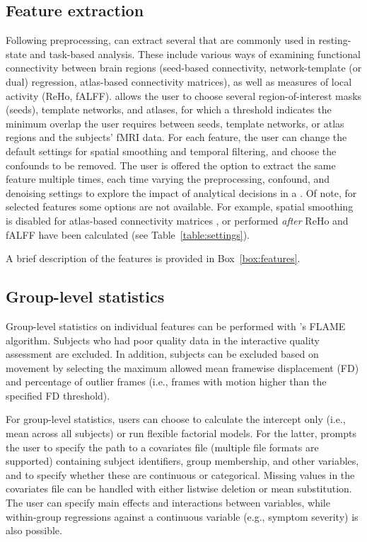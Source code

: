 \subsection{Feature extraction}\label{sec:featureextraction}

Following preprocessing,  can extract several
 that are commonly used in resting-state and task-based
analysis. These include various ways of examining functional connectivity
between brain regions (seed-based connectivity, network-template (or dual)
regression, atlas-based connectivity matrices), as well as measures of
local activity (ReHo, fALFF).  allows the user to choose
several region-of-interest masks (seeds), template networks, and atlases,
for which a threshold indicates the minimum overlap the user requires
between seeds, template networks, or atlas regions and the subjects' fMRI
data. For each feature, the user can change the default settings for
spatial smoothing and temporal filtering, and choose the confounds to be
removed. The user is offered the option to extract the same feature
multiple times, each time varying the preprocessing, confound, and
denoising settings to explore the impact of analytical decisions in a
. Of note, for selected features some options are
not available. For example, spatial smoothing is disabled for atlas-based
connectivity matrices \parencite{10.1111/ejn.13717}, or performed \emph{after}
ReHo and fALFF have been calculated (see Table~\ref{table:settings}).

A brief description of the features is provided in Box~\ref{box:features}.

\subsection{Group-level statistics}

Group-level statistics on individual features can be performed with
's FLAME algorithm. Subjects who had poor quality data in the
interactive quality assessment are excluded. In addition, subjects can be
excluded based on movement by selecting the maximum allowed mean framewise
displacement (FD) and percentage of outlier frames (i.e., frames with
motion higher than the specified FD threshold).

For group-level statistics, users can choose to calculate the intercept
only (i.e., mean across all subjects) or run flexible factorial models. For
the latter,  prompts the user to specify the path to a
covariates file (multiple file formats are supported) containing subject
identifiers, group membership, and other variables, and to specify whether
these are continuous or categorical. Missing values in the covariates file
can be handled with either listwise deletion or mean substitution. The user
can specify main effects and interactions between variables, while
within-group regressions against a continuous variable (e.g., symptom
severity) is also possible.

